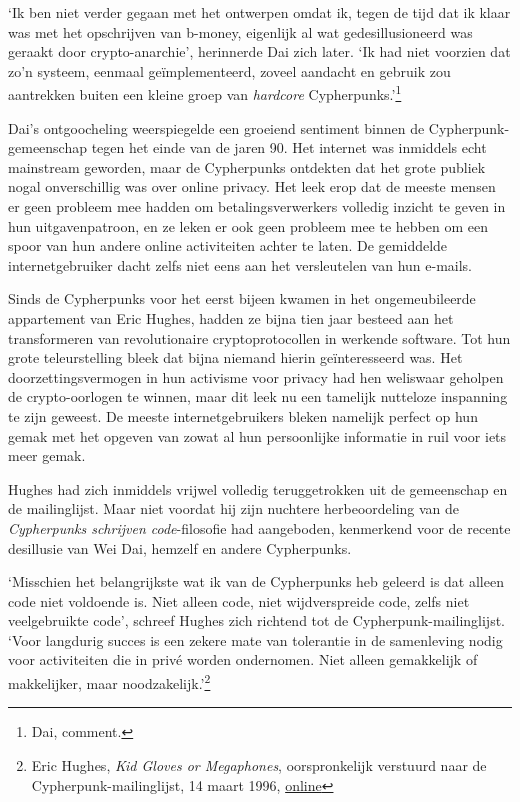 \documentclass[
  a5paper,
  smalldemyvopaper,11pt,twoside,onecolumn,openright,extrafontsizes,
hidelinks]{memoir}
\begin{document}
`Ik ben niet verder gegaan met het ontwerpen omdat ik, tegen de tijd dat
ik klaar was met het opschrijven van b-money, eigenlijk al wat
gedesillusioneerd was geraakt door crypto-anarchie', herinnerde Dai zich
later. `Ik had niet voorzien dat zo'n systeem, eenmaal geïmplementeerd,
zoveel aandacht en gebruik zou aantrekken buiten een kleine groep van
\emph{hardcore} Cypherpunks.'\footnote{Dai, comment.}

Dai's ontgoocheling weerspiegelde een groeiend sentiment binnen de
Cypherpunk-gemeenschap tegen het einde van de jaren 90. Het internet was
inmiddels echt mainstream geworden, maar de Cypherpunks ontdekten dat
het grote publiek nogal onverschillig was over online privacy. Het leek
erop dat de meeste mensen er geen probleem mee hadden om
betalingsverwerkers volledig inzicht te geven in hun uitgavenpatroon, en
ze leken er ook geen probleem mee te hebben om een
\hspace{0pt}\hspace{0pt}spoor van hun andere online activiteiten achter
te laten. De gemiddelde internetgebruiker dacht zelfs niet eens aan het
versleutelen van hun e-mails.

Sinds de Cypherpunks voor het eerst bijeen kwamen in het ongemeubileerde
appartement van Eric Hughes, hadden ze bijna tien jaar besteed aan het
transformeren van revolutionaire cryptoprotocollen in werkende software.
Tot hun grote teleurstelling bleek dat bijna niemand hierin
geïnteresseerd was. Het doorzettingsvermogen in hun activisme voor
privacy had hen weliswaar geholpen de crypto-oorlogen te winnen, maar
dit leek nu een tamelijk nutteloze inspanning te zijn geweest. De meeste
internetgebruikers bleken namelijk perfect op hun gemak met het opgeven
van zowat al hun persoonlijke informatie in ruil voor iets meer gemak.

Hughes had zich inmiddels vrijwel volledig teruggetrokken uit de
gemeenschap en de mailinglijst. Maar niet voordat hij zijn nuchtere
herbeoordeling van de \emph{Cypherpunks schrijven code}-filosofie had
aangeboden, kenmerkend voor de recente desillusie van Wei Dai, hemzelf
en andere Cypherpunks.

`Misschien het belangrijkste wat ik van de Cypherpunks heb geleerd is
dat alleen code niet voldoende is. Niet alleen code, niet wijdverspreide
code, zelfs niet veelgebruikte code', schreef Hughes zich richtend tot
de Cypherpunk-mailinglijst. `Voor langdurig succes is een zekere mate
van tolerantie in de samenleving nodig voor activiteiten die in privé
worden ondernomen. Niet alleen gemakkelijk of makkelijker, maar
noodzakelijk.'\footnote{Eric Hughes, \emph{Kid Gloves or Megaphones},
  oorspronkelijk verstuurd naar de Cypherpunk-mailinglijst, 14 maart
  1996,
  \href{https://cypherpunks.venona.com/date/1996/03/msg00932.html}{online}}
\end{document}
